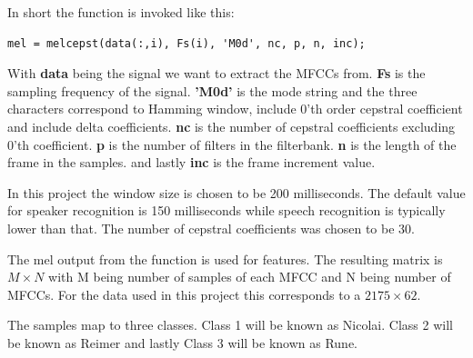 In short the function is invoked like this:
\begin{verbatim}
mel = melcepst(data(:,i), Fs(i), 'M0d', nc, p, n, inc);
\end{verbatim}
With \textbf{data} being the signal we want to extract the MFCCs from. 
\textbf{Fs} is the sampling frequency of the signal. 
\textbf{'M0d'} is the mode string and the three characters correspond to Hamming window, include 0'th order cepstral coefficient and include delta coefficients.
\textbf{nc} is the number of cepstral coefficients excluding 0'th coefficient.
\textbf{p} is the number of filters in the filterbank.
\textbf{n} is the length of the frame in the samples.
and lastly \textbf{inc} is the frame increment value.

In this project the window size is chosen to be 200 milliseconds. The default value for speaker recognition is 150 milliseconds while speech recognition is typically lower than that. The number of cepstral coefficients was chosen to be 30.

The mel output from the function is used for features. The resulting matrix is $M \times N$ with M being number of samples of each MFCC and N being number of MFCCs. For the data used in this project this corresponds to a $2175 \times 62$.

The samples map to three classes. Class 1 will be known as Nicolai. Class 2 will be known as Reimer and lastly Class 3 will be known as Rune.


